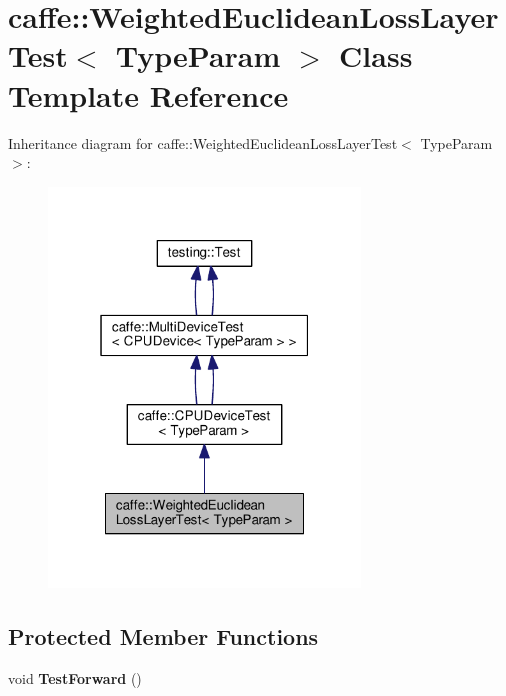 \hypertarget{classcaffe_1_1_weighted_euclidean_loss_layer_test}{}\section{caffe\+:\+:Weighted\+Euclidean\+Loss\+Layer\+Test$<$ Type\+Param $>$ Class Template Reference}
\label{classcaffe_1_1_weighted_euclidean_loss_layer_test}


Inheritance diagram for caffe\+:\+:Weighted\+Euclidean\+Loss\+Layer\+Test$<$ Type\+Param $>$\+:
\nopagebreak
\begin{figure}[H]
\begin{center}
\leavevmode
\includegraphics[width=235pt]{classcaffe_1_1_weighted_euclidean_loss_layer_test__inherit__graph}
\end{center}
\end{figure}
\subsection*{Protected Member Functions}
\begin{DoxyCompactItemize}
\item 
\mbox{\label{classcaffe_1_1_weighted_euclidean_loss_layer_test_ac3d765579f881e0a186db5d756ce1047}} 
void {\bfseries Test\+Forward} ()
\end{DoxyCompactItemize}
